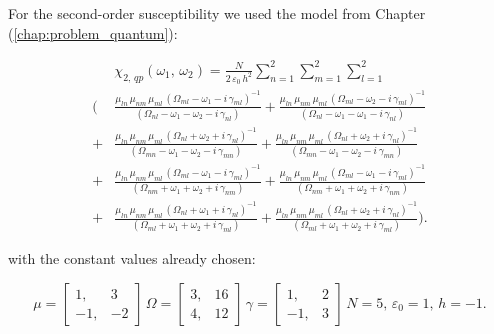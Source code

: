 \documentclass[12pt,twoside,a4paper]{article}
\numberwithin{equation}{subsection}
\numberwithin{figure}{subsection}
\begin{document}
For the second-order susceptibility we used the model from Chapter (\ref{chap:problem_quantum}):

\begin{equation}  \label{eq:nclin_chipp2}
  \begin{split} 
     & \chi_{2, \, qp}(\omega_1, \, \omega_2 ) = 
    \frac{N} {2 \, \varepsilon_0 \, h^2} \sum_{n=1}^{2} \sum_{m=1}^{2} \sum_{l=1}^{2} 
    \\ ( & \frac {{\mu_{ln}} \, {\mu_{nm}} \, {\mu_{ml}} \, ({\Omega_{ml}} - \omega_1 - i \, {\gamma_{ml}})^{-1} }
        {({\Omega_{nl}} - \omega_1 - \omega_2 - i \, {\gamma_{nl}}) }
       + \frac {{\mu_{ln}} \, {\mu_{nm}} \, {\mu_{ml}} \, ({\Omega_{ml}} - \omega_2 - i \, {\gamma_{ml}})^{-1} }
        {({\Omega_{nl}} - \omega_1 - \omega_1 - i \, {\gamma_{nl}}) } 
    \\ + & \frac {{\mu_{ln}} \, {\mu_{nm}} \, {\mu_{ml}} \, ({\Omega_{nl}} + \omega_2 + i \, {\gamma_{nl}})^{-1} }
        {({\Omega_{mn}} - \omega_1 - \omega_2 - i \, {\gamma_{mn}}) } 
       + \frac {{\mu_{ln}} \, {\mu_{nm}} \, {\mu_{ml}} \, ({\Omega_{nl}} + \omega_2 + i \, {\gamma_{nl}})^{-1} }
        {({\Omega_{mn}} - \omega_1 - \omega_2 - i \, {\gamma_{mn}}) } 
    \\ + & \frac {{\mu_{ln}} \, {\mu_{nm}} \, {\mu_{ml}} \, ({\Omega_{ml}} - \omega_1 - i \, {\gamma_{ml}})^{-1} }
        {({\Omega_{nm}} + \omega_1 + \omega_2 + i \, {\gamma_{nm}}) } 
       + \frac {{\mu_{ln}} \, {\mu_{nm}} \, {\mu_{ml}} \, ({\Omega_{ml}} - \omega_1 - i \, {\gamma_{ml}})^{-1} }
        {({\Omega_{nm}} + \omega_1 + \omega_2 + i \, {\gamma_{nm}}) } 
    \\ + & \frac {{\mu_{ln}} \, {\mu_{nm}} \, {\mu_{ml}} \, ({\Omega_{nl}} + \omega_1 + i \, {\gamma_{nl}})^{-1} }
        {({\Omega_{ml}} + \omega_1 + \omega_2 + i \, {\gamma_{ml}}) } 
       + \frac {{\mu_{ln}} \, {\mu_{nm}} \, {\mu_{ml}} \, ({\Omega_{nl}} + \omega_2 + i \, {\gamma_{nl}})^{-1} }
        {({\Omega_{ml}} + \omega_1 + \omega_2 + i \, {\gamma_{ml}})}).
  \end{split} 
\end{equation}

with the constant values already chosen:

\begin{equation} \label{eq:nclin_const2}
  \mu = \begin{bmatrix} 
    1,  &  3 \\ 
    -1, & -2 
  \end{bmatrix} \, 
  \Omega = \begin{bmatrix} 
    3, & 16 \\ 
    4, & 12 
  \end{bmatrix} \,
  \gamma = \begin{bmatrix} 
    1, & 2 \\ 
   -1, & 3
  \end{bmatrix} \, 
  N = 5, \, 
  \varepsilon_0 = 1, \,
  h= - 1.
\end{equation}
\end{document}
